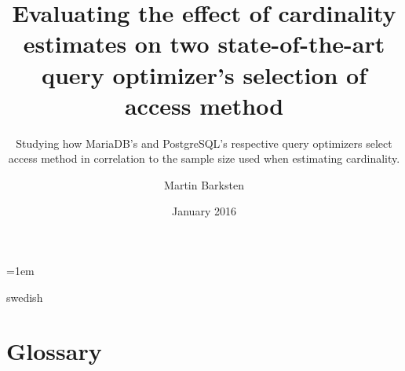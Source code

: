\documentclass[a4paper,11pt]{kth-mag}
\title{Evaluating the effect of cardinality estimates on two state-of-the-art
  query optimizer's selection of access method}
\subtitle{Studying how MariaDB's and PostgreSQL's respective query optimizers
  select access method in correlation to the sample size used when estimating cardinality.}
\author{Martin Barksten}
\date{January 2016}
\begin{document}
\lstset{basicstyle=\ttfamily,breaklines=true}
\lstset{frame=lines}
\emergencystretch=1em
\pgfplotsset{width=10cm, compat=1.9}
\tabulinesep=1.2mm

\makeatletter
\g@addto@macro\@floatboxreset\centering
\makeatother

\newcommand{\json}[5]{
  \inputminted[breaklines, breakanywhere, fontsize=\footnotesize]{json}{#1}
  \captionof{listing}{The output when testing #2 with query #3, a statistics
    target of $#4$ and #5 repetitions.}
}
\newcommand{\clj}[1]{\texttt{#1}}
\newcommand{\sql}[1]{\texttt{#1}}
\newenvironment{indexgraph}{
  \begin{tikzpicture}[scale=0.8]
    \begin{axis}[
      ybar,
      legend style={at={(0.5,-0.15)},
        anchor=north,legend columns=-1},
      symbolic x coords={ct,t,mt,mm,book,cmt,cmm,est,resamb},
      nodes near coords,
      ylabel={\#access methods},
      ytick=\empty,
      xtick=data]
} {
  \legend{MariaDB, PostgreSQL}
\end{axis}
\end{tikzpicture}
}

\newenvironment{indexplot}{
\begin{tikzpicture}[scale=0.8]
  \begin{axis}[
    ylabel={\#relations with varying access methods},
    xlabel={target statistic},
    legend style={at={(0.5,-0.2)},
      anchor=north,legend columns=-1},
    xtick={0,1,2},
    ytick={0, 1,2,3,4,5},
    xticklabels={$1$, $d$, $2d$},
    domain=0:2]
}{
  \legend{PostgreSQL, MariaDB}
\end{axis}
\end{tikzpicture}
}

\frontmatter
\pagestyle{empty}
\removepagenumbers{}
\maketitle
{}
\begin{abstract}
    
\end{abstract}
\clearpage
\begin{foreignabstract}{swedish}
    
\end{foreignabstract}
\clearpage
\tableofcontents*
\clearpage
\listoffigures
\mainmatter{}
\pagestyle{newchap}

\chapter*{Glossary}\label{chap:glossary}
    
\end{document}

